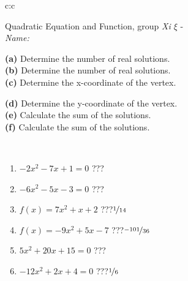 \documentclass[10pt]{report}
\begin{document}
\begin{tabular}{c:c}
\begin{minipage}[c][104.5mm][t]{0.5\linewidth}
\begin{center}
\vspace{7mm}
{\huge {\LARGE Quadratic Equation and Function}, group \textit{Xi $\xi$} -}\\[5mm]
\textit{Name:}\phantom{xxxxxxxxxxxxxxxxxxxxxxxxxxxxxxxxxxxxxxxxxxxxxxxxxxxxxxxxxxxxxxxxx}\\[5mm]
\begin{minipage}{0.95\linewidth}
\begin{center}
{\small \begin{minipage}{0.5\textwidth}
\textbf{(a)} Determine the number of real solutions. \\[1mm]
\textbf{(b)} Determine the number of real solutions. \\[1mm]
\textbf{(c)} Determine the x-coordinate of the vertex.
\end{minipage} \begin{minipage}{0.49\textwidth}
\textbf{(d)} Determine the y-coordinate of the vertex. \\[1mm]
\textbf{(e)} Calculate the sum of the solutions. \\[1mm]
\textbf{(f)} Calculate the sum of the solutions.
\end{minipage}
}
\end{center}
\end{minipage}
\\[4mm]
\begin{minipage}{0.79\linewidth}
\begin{center}
\begin{varwidth}{\linewidth}
\begin{enumerate}
\Large
\item $-2x^2-7x+1=0$\quad \dotfill\; ???\;\dotfill {}
\item $-6x^2-5x-3=0$\quad \dotfill\; ???\;\dotfill {}
\item $f(x)=7x^2+x+2$\quad \dotfill\; ???\;\dotfill \quad $\nicefrac{1}{14}$
\item $f(x)=-9x^2+5x-7$\quad \dotfill\; ???\;\dotfill \quad $\nicefrac{-101}{36}$
\item $5x^2+20x+15=0$\quad \dotfill\; ???\;\dotfill {}
\item $-12x^2+2x+4=0$\quad \dotfill\; ???\;\dotfill \quad $\nicefrac{1}{6}$
\end{enumerate}
\end{varwidth}

\end{center}
\end{minipage}
\end{center}
\end{minipage}
\end{tabular}
\end{document}
